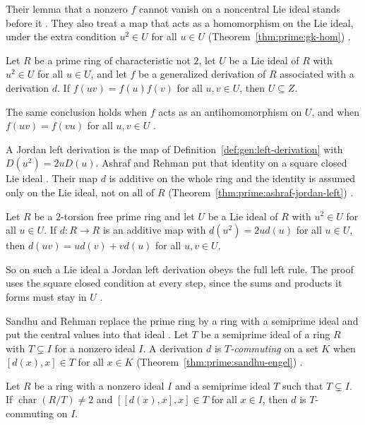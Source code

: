 Their lemma that a nonzero $f$ cannot vanish on a noncentral Lie ideal stands
before it \cite[Lemma~5, p.~863]{GolbasiKaya2006}. They also treat a map that acts
as a homomorphism on the Lie ideal, under the extra condition $u^{2}\in U$ for all
$u\in U$ (Theorem~\ref{thm:prime:gk-hom}) \cite[p.~864]{GolbasiKaya2006}.

\begin{theorem}\label{thm:prime:gk-hom}
Let $R$ be a prime ring of characteristic not $2$, let $U$ be a Lie ideal of $R$
with $u^{2}\in U$ for all $u\in U$, and let $f$ be a generalized derivation of $R$
associated with a derivation $d$. If $f(uv)=f(u)f(v)$ for all $u,v\in U$, then
$U\subseteq Z$.
\end{theorem}

The same conclusion holds when $f$ acts as an antihomomorphism on $U$, and when
$f(uv)=f(vu)$ for all $u,v\in U$
\cite[Theorems~3 and~4, p.~864]{GolbasiKaya2006}.

A Jordan left derivation is the map of
Definition~\ref{def:gen:left-derivation} with $D(u^{2})=2uD(u)$. Ashraf and
Rehman put that identity on a square closed Lie ideal
\cite[p.~200]{AshrafRehman2000}. Their map $d$ is additive on the whole ring and
the identity is assumed only on the Lie ideal, not on all of $R$ (Theorem~\ref{thm:prime:ashraf-jordan-left})
\cite[p.~205]{AshrafRehman2000}.\begin{theorem}\label{thm:prime:ashraf-jordan-left}
Let $R$ be a $2$-torsion free prime ring and let $U$ be a Lie ideal of $R$ with
$u^{2}\in U$ for all $u\in U$. If $d\colon R\to R$ is an additive map with
$d(u^{2})=2ud(u)$ for all $u\in U$, then $d(uv)=ud(v)+vd(u)$ for all $u,v\in U$.
\end{theorem}

So on such a Lie ideal a Jordan left derivation obeys the full left rule. The
proof uses the square closed condition at every step, since the sums and products
it forms must stay in $U$ \cite[p.~205]{AshrafRehman2000}.

Sandhu and Rehman replace the prime ring by a ring with a semiprime ideal and put
the central values into that ideal \cite[p.~1]{SandhuRehman2025}. Let $T$ be a
semiprime ideal of a ring $R$ with $T\subsetneq I$ for a nonzero ideal $I$. A
derivation $d$ is \emph{$T$-commuting} on a set $K$ when $[d(x),x]\in T$ for all
$x\in K$ (Theorem~\ref{thm:prime:sandhu-engel}) \cite[p.~1]{SandhuRehman2025}.

\begin{theorem}\label{thm:prime:sandhu-engel}
Let $R$ be a ring with a nonzero ideal $I$ and a semiprime ideal $T$ such that
$T\subsetneq I$. If $\operatorname{char}(R/T)\neq 2$ and $[[d(x),x],x]\in T$ for
all $x\in I$, then $d$ is $T$-commuting on $I$.
\end{theorem}

